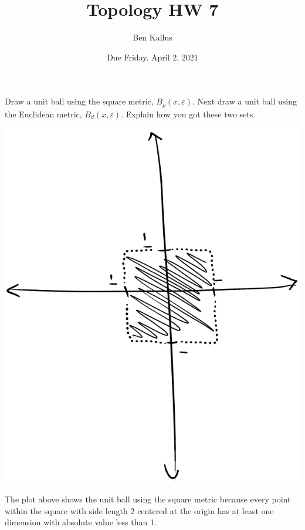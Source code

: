 \documentclass[12pt]{report}
\title{Topology HW 7}
\author{Ben Kallus}
\date{Due Friday. April 2, 2021}
\begin{document}
\maketitle

\noindent Draw a unit ball using the square metric, $B_\rho(x,\varepsilon)$. Next draw a unit ball using the Euclidean metric,  $B_d(x, \varepsilon)$. Explain how you got these two sets. 

\begin{center} \includegraphics[angle=90,scale=.4]{square.png} \end{center}
	The plot above shows the unit ball using the square metric because every point within the square with side length 2 centered at the origin has at least one dimension with absolute value less than 1.
\end{document}
